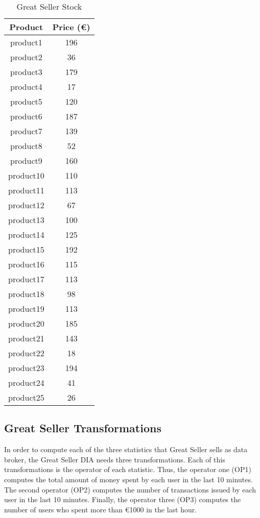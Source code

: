 \begin{table}[h!]
\centering
	\begin{tabular}{||c|c||} 
	\hline\hline
	Product & Price (\euro{}) \\ [1ex] 
	\hline\hline
	product1 & 196 \\ 
	\hline
	product2 & 36 \\ 
	\hline
	product3 & 179 \\ 
	\hline
	product4 & 17 \\ 
	\hline
	product5 & 120 \\ 
	\hline
	product6 & 187 \\ 
	\hline
	product7 & 139 \\ 
	\hline
	product8 & 52 \\ 
	\hline
	product9 & 160 \\ 
	\hline
	product10 & 110 \\ 
	\hline
	product11 & 113 \\ 
	\hline
	product12 & 67 \\ 
	\hline
	product13 & 100 \\ 
	\hline
	product14 & 125 \\ 
	\hline
	product15 & 192 \\ 
	\hline
	product16 & 115 \\ 
	\hline
	product17 & 113 \\ 
	\hline
	product18 & 98 \\ 
	\hline
	product19 & 113 \\ 
	\hline
	product20 & 185 \\ 
	\hline
	product21 & 143 \\ 
	\hline
	product22 & 18 \\ 
	\hline
	product23 & 194 \\ 
	\hline
	product24 & 41 \\ 
	\hline
	product25 & 26 \\ 
	\hline\hline
	\end{tabular}
\caption{Great Seller Stock}
\label{Great Seller Stock}
\end{table}

\subsection{Great Seller Transformations}
In order to compute each of the three statistics that Great Seller sells as data broker, the Great Seller DIA needs three transformations. Each of this transformations is the operator of each statistic. Thus, the operator one (OP1) computes the total amount of money spent by each user in the last 10 minutes. The second operator (OP2) computes the number of transactions issued by each user in the last 10 minutes. Finally, the operator three (OP3) computes the number of users who spent more than \euro{1000} in the last hour.

